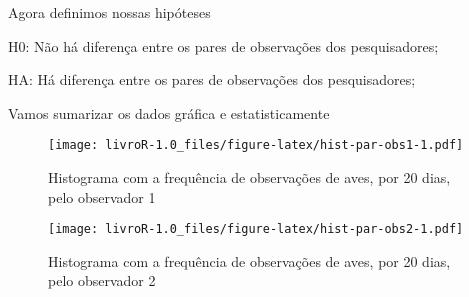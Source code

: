 \documentclass[titlepage, oneside, openany, a4paper]{book}
\newenvironment{Shaded}{\begin{snugshade}}{\end{snugshade}}
\newcommand{\DataTypeTok}[1]{\textcolor[rgb]{0.13,0.29,0.53}{#1}}
\newcommand{\DecValTok}[1]{\textcolor[rgb]{0.00,0.00,0.81}{#1}}
\newcommand{\KeywordTok}[1]{\textcolor[rgb]{0.13,0.29,0.53}{\textbf{#1}}}
\newcommand{\NormalTok}[1]{#1}
\newcommand{\OperatorTok}[1]{\textcolor[rgb]{0.81,0.36,0.00}{\textbf{#1}}}
\newcommand{\StringTok}[1]{\textcolor[rgb]{0.31,0.60,0.02}{#1}}
\begin{document}
Agora definimos nossas hipóteses

H0: Não há diferença entre os pares de observações dos pesquisadores;

HA: Há diferença entre os pares de observações dos pesquisadores;

Vamos sumarizar os dados gráfica e estatisticamente

\begin{Shaded}
\end{Shaded}

\begin{figure}
\centering
\texttt{[image: livroR-1.0\_files/figure-latex/hist-par-obs1-1.pdf]}
\caption{\label{fig:hist-par-obs1}Histograma com a frequência de observações de aves, por 20 dias, pelo observador 1}
\end{figure}

\begin{Shaded}
\end{Shaded}

\begin{figure}
\centering
\texttt{[image: livroR-1.0\_files/figure-latex/hist-par-obs2-1.pdf]}
\caption{\label{fig:hist-par-obs2}Histograma com a frequência de observações de aves, por 20 dias, pelo observador 2}
\end{figure}

\begin{Shaded}
\end{Shaded}
\end{document}
